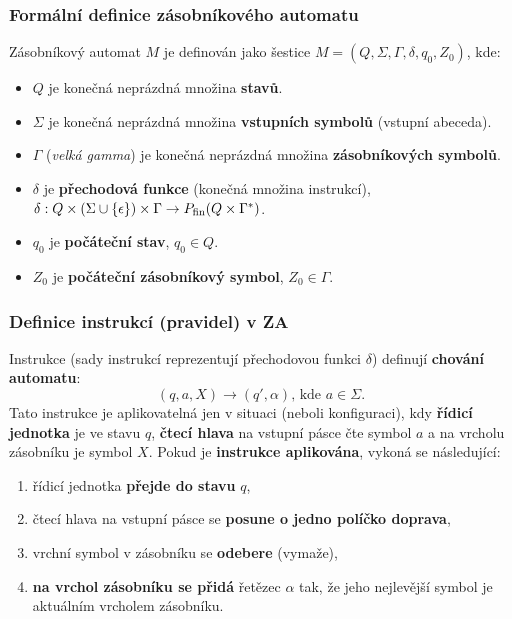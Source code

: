 \subsubsection{Formální definice zásobníkového automatu}
Zásobníkový automat $M$ je definován jako šestice $M = (Q, \Sigma, \Gamma, \delta, q_0, Z_0)$, kde:
\begin{itemize}
\item $Q$ je konečná neprázdná množina \textbf{stavů}.
\item $\Sigma$ je konečná neprázdná množina \textbf{vstupních symbolů} (vstupní abeceda).
\item $\Gamma$ (\textit{velká gamma}) je konečná neprázdná množina \textbf{zásobníkových symbolů}.
\item $\delta$ je \textbf{přechodová funkce} (konečná množina instrukcí), $\delta: Q \times (\Sigma \cup \{\epsilon\}) \times \Gamma \rightarrow P_{\rm fin}(Q \times \Gamma^*)$.
\item $q_0$ je \textbf{počáteční stav}, $q_0 \in Q$.
\item $Z_0$ je \textbf{počáteční zásobníkový symbol}, $Z_0 \in \Gamma$.
\end{itemize}

\subsubsection{Definice instrukcí (pravidel) v ZA}
Instrukce (sady instrukcí reprezentují přechodovou funkci $\delta$) definují \textbf{chování automatu}:
\begin{equation}
(q, a, X) \rightarrow (q', \alpha)\textrm{, kde } a\in \Sigma.
\end{equation}
Tato instrukce je aplikovatelná jen v situaci (neboli konfiguraci), kdy \textbf{řídicí jednotka} je ve stavu $q$, \textbf{čtecí hlava} na vstupní pásce čte symbol $a$ a na vrcholu zásobníku je symbol $X$. Pokud je \textbf{instrukce aplikována}, vykoná se následující:
\begin{enumerate}
\item řídicí jednotka \textbf{přejde do stavu} $q$,
\item čtecí hlava na vstupní pásce se \textbf{posune o jedno políčko doprava},
\item vrchní symbol v zásobníku se \textbf{odebere} (vymaže),
\item \textbf{na vrchol zásobníku se přidá} řetězec $\alpha$ tak, že jeho nejlevější symbol je aktuálním vrcholem zásobníku.
\end{enumerate}

